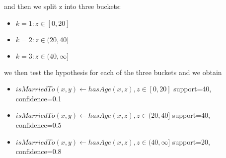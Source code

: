and then we split z into three buckets:

\begin{itemize}
 \item \begin{math} k=1: z\in[0,20]\end{math}
 \item \begin{math} k=2: z\in(20,40]\end{math}
 \item \begin{math} k=3: z\in(40,\infty]\end{math}
\end{itemize}

we then test the hypothesis for each of the three buckets and we obtain

\begin{itemize}

 \item \begin{math}isMarriedTo(x,y) \leftarrow hasAge(x,z), z\in[0,20]\end{math}	
    \newline support=40, confidence=0.1
 \item \begin{math}isMarriedTo(x,y) \leftarrow hasAge(x,z), z\in(20,40]\end{math}	
    \newline support=40, confidence=0.5
 \item \begin{math}isMarriedTo(x,y) \leftarrow hasAge(x,z), z\in(40,\infty]\end{math}
    \newline support=20, confidence=0.8

\end{itemize}

